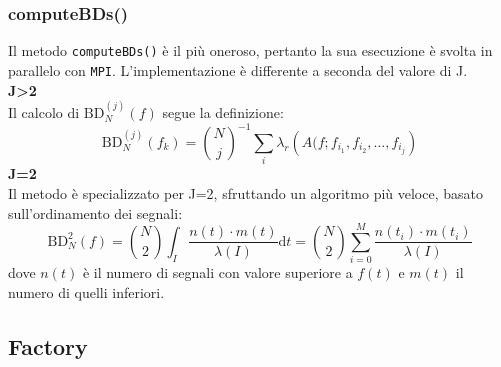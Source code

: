 \documentclass[9pt]{beamer}
\begin{document}
\begin{frame}
 \frametitle{computeBDs()}
Il metodo \texttt{computeBDs()} \`e il pi\`u oneroso, pertanto la sua esecuzione \`e svolta in parallelo con \texttt{MPI}. L'implementazione \`e
differente a seconda del valore di J.\\
\vspace{0.5cm}
\textbf{J>2}\\
\smallskip
Il calcolo di $\text{BD}^{(j)}_N(f)$ segue la definizione: 
\[
 \text{BD}^{(j)}_N(f_k) = {N \choose j}^{-1} \sum_{i} \lambda_r \left( A(f; f_{i_1}, f_{i_2}, \ldots, f_{i_j} \right)
\]
\pause
\textbf{J=2}\\
\smallskip
Il metodo \`e specializzato per J=2, sfruttando un algoritmo pi\`u veloce, basato sull'ordinamento dei segnali:
\[
  \text{BD}^{2}_{N}(f) = { N \choose 2 } \int_{I} \frac{n (t ) \cdot m (t)}{\lambda \left(I\right)} \text{d}t = { N \choose 2 } \sum_{i=0}^M \frac{n (t_i ) \cdot m (t_i)}{\lambda \left(I\right)}
\]
dove $n(t)$ \`e il numero di segnali con valore superiore a $f(t)$ e $m(t)$ il numero di quelli inferiori. 



\end{frame}


\subsection{Factory}
\end{document}
